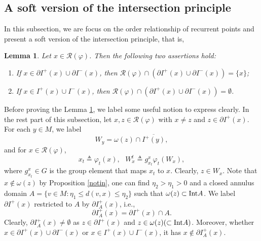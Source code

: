 \documentclass[a4paper,11pt]{article}
\theoremstyle{plain}
\newtheorem{lem}[thm]{Lemma}
\theoremstyle{definition}
\numberwithin{equation}{section}
\begin{document}
    \subsection{A soft version of the intersection principle}\label{s3.2}	

    In this subsection, we are focus on the order relationship of recurrent points and present a soft version of the intersection principle, that is,


\begin{lem}\label{sep_n}
	Let $x\in \mathcal{R}(\varphi)$. Then the following two assertions hold:
    \begin{enumerate}[{\rm (i)}]
			\item If $x\in \partial I^{+}(x)\cup \partial I^{-}(x)$, then $\mathcal{R}(\varphi)\cap (\partial  I^{+}(x)\cup \partial  I^{-}(x))=\{x\}$;
            
            \item If $x\in I^{+}(x)\cup I^{-}(x)$, then $\mathcal{R}(\varphi)\cap (\partial  I^{+}(x)\cup \partial  I^{-}(x))=\emptyset$.
    \end{enumerate}
    
\end{lem}


Before proving the Lemma \ref{sep_n}, we label some useful notion to express clearly. In the rest part of this subsection, let $x, z\in \mathcal{R}(\varphi)$ with $x\neq z$ and $z\in \partial  I^{+}(x)$. For each $y\in M$, we label $$W_{y}=\omega(z)\cap  \overline{I^{+}(y)} ,$$ and for $x\in \mathcal{R}(\varphi)$, $$x_{t}\triangleq \varphi_{t}(x),\ \ \ W_{x}^{t}\triangleq g_{x_{t}}^{x}\varphi_{t}(W_{x}),$$
where $g_{x_{t}}^{x}\in G$ is the group element that maps $x_{t}$ to $x$.
Clearly, $z\in W_x$. Note that $x\notin\omega(z)$ by Proposition \ref{notin}, one can find $\eta_2>\eta_1>0$ and a closed annulus domain $A=\{v\in M:\eta_1\le d(v,x)\le \eta_2\}$ such that $\omega(z)\subset {\rm Int}A$. We label $\partial  I^{+}(x)$ restricted to $A$ by $\partial I^{+}_{A}(x)$, i.e., $$\partial  I^{+}_{A}(x)=\partial I^{+}(x)\cap A.$$ Clearly, $\partial  I^{+}_{A}(x)\neq\emptyset$ as $z\in \partial I^{+}(x)$ and $z\in\omega(z)(\subset {\rm Int}A)$. Moreover, whether $x\in \partial I^{+}(x)\cup \partial I^{-}(x)$ or $x\in I^{+}(x)\cup I^{-}(x)$, it has $x\notin\partial  I^{+}_{A}(x)$.
\end{document}
